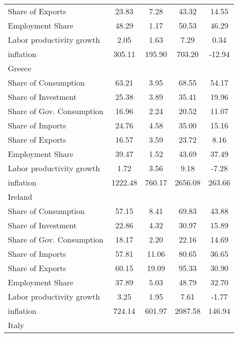 {\begin{longtable}{l*{1}{cccc}}
Share of Exports    &       23.83&        7.28&       43.32&       14.55\\
Employment Share    &       48.29&        1.17&       50.53&       46.29\\
Labor productivity growth&        2.05&        1.63&        7.29&        0.34\\
inflation           &      305.11&      195.90&      703.20&      -12.94\\
Greece              &            &            &            &            \\
Share of Consumption&       63.21&        3.95&       68.55&       54.17\\
Share of Investment &       25.38&        3.89&       35.41&       19.96\\
Share of Gov. Consumption&       16.96&        2.24&       20.52&       11.07\\
Share of Imports    &       24.76&        4.58&       35.00&       15.16\\
Share of Exports    &       16.57&        3.59&       23.72&        8.16\\
Employment Share    &       39.47&        1.52&       43.69&       37.49\\
Labor productivity growth&        1.72&        3.56&        9.18&       -7.28\\
inflation           &     1222.48&      760.17&     2656.08&      263.66\\
Ireland             &            &            &            &            \\
Share of Consumption&       57.15&        8.41&       69.83&       43.88\\
Share of Investment &       22.86&        4.32&       30.97&       15.89\\
Share of Gov. Consumption&       18.17&        2.20&       22.16&       14.69\\
Share of Imports    &       57.81&       11.06&       80.65&       36.65\\
Share of Exports    &       60.15&       19.09&       95.33&       30.90\\
Employment Share    &       37.89&        5.03&       48.79&       32.70\\
Labor productivity growth&        3.25&        1.95&        7.61&       -1.77\\
inflation           &      724.14&      601.97&     2087.58&      146.94\\
Italy               &            &            &            &            \\

\end{longtable}}
